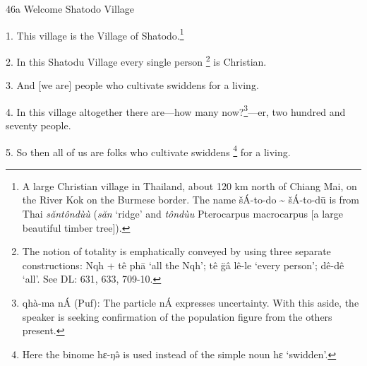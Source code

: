 
46a Welcome Shatodo Village

1. This village is the Village of Shatodo.\footnote{A large Christian village in Thailand, about 120 km north of Chiang Mai, on the River Kok on the Burmese border. The name šÁ-to-do \textasciitilde{} šÁ-to-dū is from Thai \textit{săntôndùù} (\textit{săn} `ridge' and \textit{tôndùu }Pterocarpus macrocarpus [a large beautiful timber tree]).}

2. In this Shatodu Village every single person \footnote{The notion of totality is emphatically conveyed by using three separate constructions: Nqh + tê phā `all the Nqh'; tê g̈â lê-le `every person'; dê-dê `all'. See DL: 631, 633, 709-10.} is Christian.

3. And [we are] people who cultivate swiddens for a living.

4. In this village altogether there are---how many now?\footnote{qhà-ma nÁ (Puf): The particle nÁ expresses uncertainty. With this aside, the speaker is seeking confirmation of the population figure from the others present.}---er, two hundred and
seventy people.

5. So then all of us are folks who cultivate swiddens \footnote{Here the binome hɛ-ŋə̂ is used instead of the simple noun hɛ `swidden'.} for a living.

